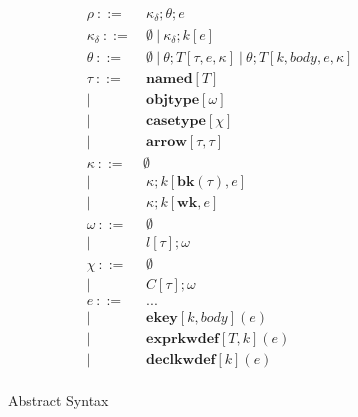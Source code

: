 \begin{figure*}
\begin{align*}
      \rho              ~::=&~ \kappa_{\delta};\theta;e\\
      \kappa_{\delta}   ~::=&~ \emptyset ~ | ~ \kappa_{\delta};k[e]\\
      \theta                  ~::=&~ \emptyset ~ | ~ \theta; T[\tau, e, \kappa] ~ | ~ \theta; T[k, body, e, \kappa]\\
      \tau              ~::=&~ \mathbf{named}[T]\\
                              |~    & ~ \mathbf{objtype}[\omega]\\
                              |~    & ~ \mathbf{casetype}[\chi]\\
                              |~  & ~ \mathbf{arrow}[\tau, \tau]\\
      \kappa                  ~::=& \emptyset\\       
                              |~  & ~ \kappa;k[\mathbf{bk}(\tau),e]\\
                              |~  & ~ \kappa;k[\mathbf{wk},e]\\
      \omega                  ~::=&~ \emptyset\\
                              | ~ &~ l[\tau];\omega\\
      \chi              ~::=& ~\emptyset ~\\
                              |~ & ~C[\tau];\omega\\
      e                       ~::=&~ ...\\
                              | ~ &~ \mathbf{ekey}[k,body](e)\\
                              | ~ &~ \mathbf{exprkwdef}[T,k](e)\\
                              | ~ &~ \mathbf{declkwdef}[k](e)\\
\end{align*}
\caption{Abstract Syntax}
\label{formal-syntax}
\end{figure*}